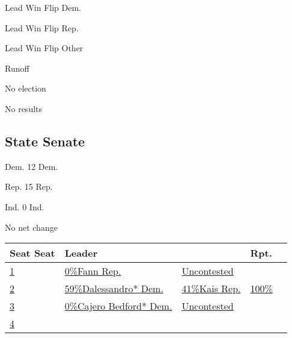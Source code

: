  Lead Win Flip Dem.

 Lead Win Flip Rep.

 Lead Win Flip Other

 Runoff

 No election

 No results

\hypertarget{state-senate}{%
\subsection{State Senate}\label{state-senate}}

Dem. 12 Dem.

Rep. 15 Rep.

Ind. 0 Ind.

No net change

\begin{longtable}[]{@{}lllll@{}}
\toprule
Seat Seat & Leader & & Rpt. &\tabularnewline
\midrule
\endhead
\href{//www.nytimes3xbfgragh.onion/elections/2016/results/arizona-state-senate-district-1}{1}
&
\href{//www.nytimes3xbfgragh.onion/elections/2016/results/arizona-state-senate-district-1}{
0\%Fann Rep.} &
\href{//www.nytimes3xbfgragh.onion/elections/2016/results/arizona-state-senate-district-1}{Uncontested}
&
\href{//www.nytimes3xbfgragh.onion/elections/2016/results/arizona-state-senate-district-1}{}
&
\href{//www.nytimes3xbfgragh.onion/elections/2016/results/arizona-state-senate-district-1}{}\tabularnewline
\href{//www.nytimes3xbfgragh.onion/elections/2016/results/arizona-state-senate-district-2}{2}
&
\href{//www.nytimes3xbfgragh.onion/elections/2016/results/arizona-state-senate-district-2}{
59\%Dalessandro* Dem.} &
\href{//www.nytimes3xbfgragh.onion/elections/2016/results/arizona-state-senate-district-2}{
41\%Kais Rep.} &
\href{//www.nytimes3xbfgragh.onion/elections/2016/results/arizona-state-senate-district-2}{100\%}
&
\href{//www.nytimes3xbfgragh.onion/elections/2016/results/arizona-state-senate-district-2}{}\tabularnewline
\href{//www.nytimes3xbfgragh.onion/elections/2016/results/arizona-state-senate-district-3}{3}
&
\href{//www.nytimes3xbfgragh.onion/elections/2016/results/arizona-state-senate-district-3}{
0\%Cajero Bedford* Dem.} &
\href{//www.nytimes3xbfgragh.onion/elections/2016/results/arizona-state-senate-district-3}{Uncontested}
&
\href{//www.nytimes3xbfgragh.onion/elections/2016/results/arizona-state-senate-district-3}{}
&
\href{//www.nytimes3xbfgragh.onion/elections/2016/results/arizona-state-senate-district-3}{}\tabularnewline
\href{//www.nytimes3xbfgragh.onion/elections/2016/results/arizona-state-senate-district-4}{4}

\end{longtable}
